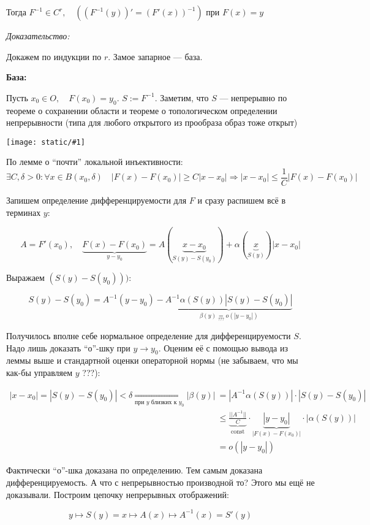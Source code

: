 \documentclass{article}
\def\image#1{\texttt{[image: static/\#1]}}
\DeclareMathOperator{\const}{const}
\begin{document}
Тогда $F^{-1} \in C^r, \quad ((F^{-1}(y))' = (F'(x))^{-1})$ при $F(x) = y$

\textit{Доказательство:}

Докажем по индукции по $r$. Замое запарное --- база.

\textbf{База:}

Пусть $x_0 \in O, \quad F(x_0) = y_0$. $S := F^{-1}$. Заметим, что $S$ --- непрерывно по теореме о сохранении области и теореме о топологическом определении непрерывности (типа для любого открытого из прообраза образ тоже открыт)

\image{glad_obr.png}

По лемме о ``почти'' локальной инъективности:
\[\exists C, \delta > 0: \forall x \in B(x_0, \delta) \quad |F(x) - F(x_0)| \ge C|x - x_0| \Rightarrow |x - x_0| \le \frac{1}{C}|F(x) - F(x_0)|\]

Запишем определение дифференцируемости для $F$ и сразу распишем всё в терминах $y$:

\[A = F'(x_0), \quad \underbrace{F(x) - F(x_0)}_{y - y_0} = A(\underbrace{x - x_0}_{S(y) - S(y_0)}) + \alpha(\underbrace{x}_{S(y)})|x - x_0|\]

Выражаем $(S(y) - S(y_0)))$:

\[S(y) - S(y_0) = A^{-1}(y - y_0) - \underbrace{A^{-1}\alpha(S(y))|S(y) - S(y_0)|}_{\beta(y) \underset{???}{=} o(|y - y_0|)}\]

Получилось вполне себе нормальное определение для дифференцируемости $S$. Надо лишь доказать ``о''-шку при $y \rightarrow y_0$. Оценим её с помощью вывода из леммы выше и стандартной оценки операторной нормы (не забываем, что мы как-бы управляем $y$ ???):

\begin{align*}
    |x - x_0| = |S(y) - S(y_0)| < \delta \underset{\text{при }y\text{ близких к }y_0}{\Rightarrow} |\beta(y)| &= |A^{-1}\alpha(S(y))|\cdot|S(y) - S(y_0)| \\
    &\le \underbrace{\frac{||A^{-1}||}{C}}_{\const}\cdot\underbrace{|y - y_0|}_{|F(x) - F(x_0)|}\cdot|\alpha(S(y))| \\
    &= o(|y - y_0|)
\end{align*}

Фактически ``о''-шка доказана по определению. Тем самым доказана дифференцируемость. А что с непрерывностью производной то? Этого мы ещё не доказывали. Построим цепочку непрерывных отображений:

\[y \mapsto S(y) = x \mapsto A(x) \mapsto A^{-1}(x) = S'(y)\]
\end{document}
